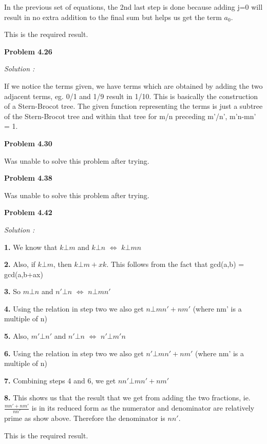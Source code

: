 \documentclass[12pt]{article}
\begin{document}
In the previous set of equations, the 2nd last step is done because adding j=0 will result in no extra addition to the final sum but helps us get the term $a_0$. 

This is the required result.

\medskip
\medskip

\noindent
{\bf Problem 4.26}

\textit {Solution :} 

If we notice the terms given, we have terms which are obtained by adding the two adjacent terms, eg. {0/1 and 1/9 result in 1/10}. This is basically the construction of a Stern-Brocot tree. The given function representing the terms is just a subtree of the Stern-Brocot tree and within that tree for m/n preceding m'/n', m'n-mn' = 1.

\medskip
\medskip

\noindent
{\bf Problem 4.30}

Was unable to solve this problem after trying.

\medskip

\noindent
{\bf Problem 4.38}

Was unable to solve this problem after trying.

\medskip
\medskip

\noindent
{\bf Problem 4.42}

\textit {Solution :} 

{\bf 1. } We know that $k\bot m$ and $k\bot n$ $\Longleftrightarrow$ $k\bot mn$

{\bf 2. } Also, if $k\bot m$, then $k\bot m+xk$. This follows from the fact that gcd(a,b) = gcd(a,b+ax)

{\bf 3. } So $m \bot n$ and $n' \bot n$ $\Longleftrightarrow$ $n \bot mn'$

{\bf 4. } Using the relation in step two we also get $n \bot mn' + nm'$ (where nm' is a multiple of n)

{\bf 5. } Also, $m' \bot n'$ and $n' \bot n$ $\Longleftrightarrow$ $n' \bot m'n$

{\bf 6. } Using the relation in step two we also get $n' \bot mn' + nm'$ (where nm' is a multiple of n)

{\bf 7. } Combining steps 4 and 6, we get $nn' \bot mn' + nm'$

{\bf 8. } This shows us that the result that we get from adding the two fractions, ie. {$\frac{mn'+nm'}{nn'}$} is in its reduced form as the numerator and denominator are relatively prime as show above. Therefore the denominator is $nn'$.

This is the required result.
\end{document}
